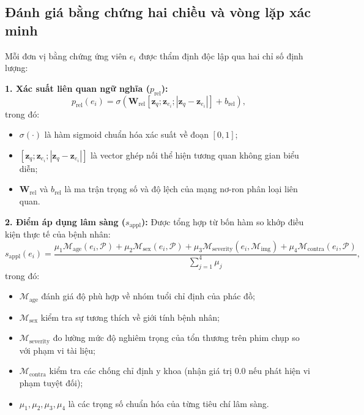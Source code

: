 \subsection{Đánh giá bằng chứng hai chiều và vòng lặp xác minh}
Mỗi đơn vị bằng chứng ứng viên $e_i$ được thẩm định độc lập qua hai chỉ số định lượng:

\textbf{1. Xác suất liên quan ngữ nghĩa ($p_{\mathrm{rel}}$):}
\begin{equation}
    p_{\mathrm{rel}}(e_i) = \sigma\left(\mathbf{W}_{\mathrm{rel}} [\mathbf{z}_q; \mathbf{z}_{e_i}; |\mathbf{z}_q - \mathbf{z}_{e_i}|] + b_{\mathrm{rel}}\right),
\end{equation}
trong đó:
\begin{itemize}
    \item $\sigma(\cdot)$ là hàm sigmoid chuẩn hóa xác suất về đoạn $[0, 1]$;
    \item $[\mathbf{z}_q; \mathbf{z}_{e_i}; |\mathbf{z}_q - \mathbf{z}_{e_i}|]$ là vector ghép nối thể hiện tương quan không gian biểu diễn;
    \item $\mathbf{W}_{\mathrm{rel}}$ và $b_{\mathrm{rel}}$ là ma trận trọng số và độ lệch của mạng nơ-ron phân loại liên quan.
\end{itemize}

\textbf{2. Điểm áp dụng lâm sàng ($s_{\mathrm{appl}}$):}
Được tổng hợp từ bốn hàm so khớp điều kiện thực tế của bệnh nhân:
\begin{equation}
    s_{\mathrm{appl}}(e_i) = \frac{\mu_1 \mathcal{M}_{\mathrm{age}}(e_i, \mathcal{P}) + \mu_2 \mathcal{M}_{\mathrm{sex}}(e_i, \mathcal{P}) + \mu_3 \mathcal{M}_{\mathrm{severity}}(e_i, \mathcal{M}_{\mathrm{img}}) + \mu_4 \mathcal{M}_{\mathrm{contra}}(e_i, \mathcal{P})}{\sum_{j=1}^4 \mu_j},
\end{equation}
trong đó:
\begin{itemize}
    \item $\mathcal{M}_{\mathrm{age}}$ đánh giá độ phù hợp về nhóm tuổi chỉ định của phác đồ;
    \item $\mathcal{M}_{\mathrm{sex}}$ kiểm tra sự tương thích về giới tính bệnh nhân;
    \item $\mathcal{M}_{\mathrm{severity}}$ đo lường mức độ nghiêm trọng của tổn thương trên phim chụp so với phạm vi tài liệu;
    \item $\mathcal{M}_{\mathrm{contra}}$ kiểm tra các chống chỉ định y khoa (nhận giá trị $0.0$ nếu phát hiện vi phạm tuyệt đối);
    \item $\mu_1, \mu_2, \mu_3, \mu_4$ là các trọng số chuẩn hóa của từng tiêu chí lâm sàng.
\end{itemize}

